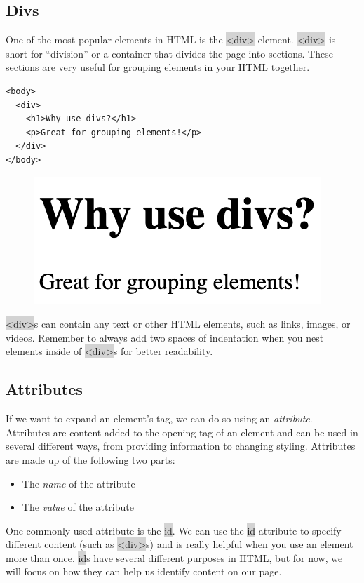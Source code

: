 \documentclass[11pt]{article}
\begin{document}
\subsection{Divs}
One of the most popular elements in HTML is the \colorbox{lightgray}{<div>} element. \colorbox{lightgray}{<div>} is short for “division” or a container that divides the page into sections. These sections are very useful for grouping elements in your HTML together.
\begin{lstlisting}
<body>
  <div>
    <h1>Why use divs?</h1>
    <p>Great for grouping elements!</p>
  </div>
</body>
\end{lstlisting}
\begin{figure}[H]
\includegraphics[scale = 0.7]{1_2}
\end{figure}
\colorbox{lightgray}{<div>}s can contain any text or other HTML elements, such as links, images, or videos. Remember to always add two spaces of indentation when you nest elements inside of \colorbox{lightgray}{<div>}s for better readability.

\subsection{Attributes}
If we want to expand an element’s tag, we can do so using an \textit{attribute}. Attributes are content added to the opening tag of an element and can be used in several different ways, from providing information to changing styling. Attributes are made up of the following two parts:
\begin{itemize}[leftmargin = *]
\item The \textit{name} of the attribute
\item The \textit{value} of the attribute
\end{itemize}
One commonly used attribute is the \colorbox{lightgray}{id}. We can use the \colorbox{lightgray}{id} attribute to specify different content (such as \colorbox{lightgray}{<div>}s) and is really helpful when you use an element more than once. \colorbox{lightgray}{id}s have several different purposes in HTML, but for now, we will focus on how they can help us identify content on our page.
\end{document}
